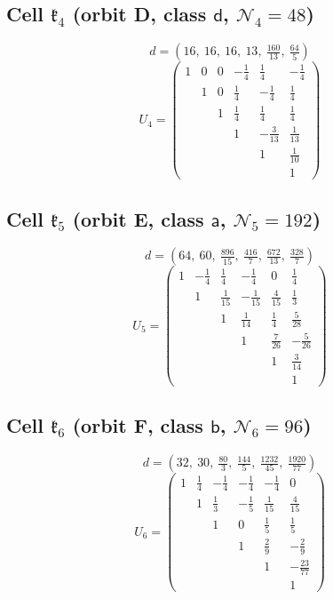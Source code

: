 \documentclass[11pt,reqno]{amsart}
\renewcommand{\_}{\origunderscore\allowbreak}
\numberwithin{equation}{section}
\theoremstyle{plain}
\theoremstyle{definition}
\theoremstyle{remark}
\newcommand{\Cell}[1]{\mathfrak{k}_{#1}}     %
\newcommand{\norm}[1]{\mathcal{N}_{#1}}      %
\begin{document}
\subsection*{Cell \texorpdfstring{$\Cell4$}{C004} (orbit D, class \(\mathsf d\), \(\norm4=48\))}
\[
d=\left(16,\ 16,\ 16,\ 13,\ \tfrac{160}{13},\ \tfrac{64}{5}\right)
\]
\[
U_4=\begin{pmatrix}
1 & 0 & 0 & -\tfrac14 & \tfrac14 & -\tfrac14\\
 & 1 & 0 & \tfrac14 & -\tfrac14 & \tfrac14\\
 & & 1 & \tfrac14 & \tfrac14 & \tfrac14\\
 & & & 1 & -\tfrac3{13} & \tfrac1{13}\\
 & & & & 1 & \tfrac1{10}\\
 & & & & & 1
\end{pmatrix}
\]

\subsection*{Cell \texorpdfstring{$\Cell5$}{C005} (orbit E, class \(\mathsf a\), \(\norm5=192\))}
\[
d=\left(64,\ 60,\ \tfrac{896}{15},\ \tfrac{416}{7},\ \tfrac{672}{13},\ \tfrac{328}{7}\right)
\]
\[
U_5=\begin{pmatrix}
1 & -\tfrac14 & \tfrac14 & -\tfrac14 & 0 & \tfrac14\\
 & 1 & \tfrac1{15} & -\tfrac1{15} & \tfrac4{15} & \tfrac13\\
 & & 1 & \tfrac1{14} & \tfrac14 & \tfrac5{28}\\
 & & & 1 & \tfrac7{26} & -\tfrac5{26}\\
 & & & & 1 & \tfrac3{14}\\
 & & & & & 1
\end{pmatrix}
\]

\subsection*{Cell \texorpdfstring{$\Cell6$}{C006} (orbit F, class \(\mathsf b\), \(\norm6=96\))}
\[
d=\left(32,\ 30,\ \tfrac{80}{3},\ \tfrac{144}{5},\ \tfrac{1232}{45},\ \tfrac{1920}{77}\right)
\]
\[
U_6=\begin{pmatrix}
1 & \tfrac14 & -\tfrac14 & -\tfrac14 & -\tfrac14 & 0\\
 & 1 & \tfrac13 & -\tfrac15 & \tfrac1{15} & \tfrac4{15}\\
 & & 1 & 0 & \tfrac15 & \tfrac15\\
 & & & 1 & \tfrac29 & -\tfrac29\\
 & & & & 1 & -\tfrac{23}{77}\\
 & & & & & 1
\end{pmatrix}
\]
\end{document}
